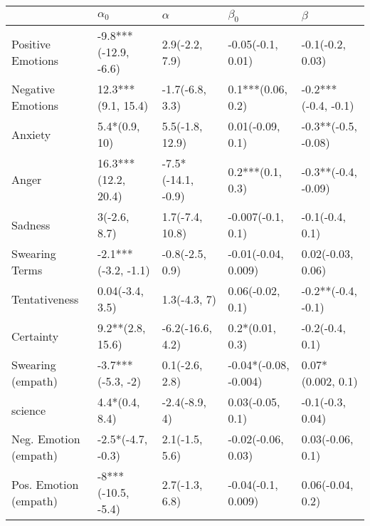 \begin{tabular}{lllll}
\toprule
{} &            $\alpha_0$ &            $\alpha$ &              $\beta_0$ &              $\beta$ \\
\midrule
Positive Emotions     &  -9.8***(-12.9, -6.6) &      2.9(-2.2, 7.9) &      -0.05(-0.1, 0.01) &     -0.1(-0.2, 0.03) \\
Negative Emotions     &    12.3***(9.1, 15.4) &     -1.7(-6.8, 3.3) &      0.1***(0.06, 0.2) &  -0.2***(-0.4, -0.1) \\
Anxiety               &         5.4*(0.9, 10) &     5.5(-1.8, 12.9) &       0.01(-0.09, 0.1) &  -0.3**(-0.5, -0.08) \\
Anger                 &   16.3***(12.2, 20.4) &  -7.5*(-14.1, -0.9) &       0.2***(0.1, 0.3) &  -0.3**(-0.4, -0.09) \\
Sadness               &          3(-2.6, 8.7) &     1.7(-7.4, 10.8) &      -0.007(-0.1, 0.1) &      -0.1(-0.4, 0.1) \\
Swearing Terms        &   -2.1***(-3.2, -1.1) &     -0.8(-2.5, 0.9) &    -0.01(-0.04, 0.009) &    0.02(-0.03, 0.06) \\
Tentativeness         &       0.04(-3.4, 3.5) &        1.3(-4.3, 7) &       0.06(-0.02, 0.1) &   -0.2**(-0.4, -0.1) \\
Certainty             &      9.2**(2.8, 15.6) &    -6.2(-16.6, 4.2) &        0.2*(0.01, 0.3) &      -0.2(-0.4, 0.1) \\
Swearing (empath)     &     -3.7***(-5.3, -2) &      0.1(-2.6, 2.8) &  -0.04*(-0.08, -0.004) &    0.07*(0.002, 0.1) \\
science               &        4.4*(0.4, 8.4) &       -2.4(-8.9, 4) &       0.03(-0.05, 0.1) &     -0.1(-0.3, 0.04) \\
Neg. Emotion (empath) &     -2.5*(-4.7, -0.3) &      2.1(-1.5, 5.6) &     -0.02(-0.06, 0.03) &     0.03(-0.06, 0.1) \\
Pos. Emotion (empath) &    -8***(-10.5, -5.4) &      2.7(-1.3, 6.8) &     -0.04(-0.1, 0.009) &     0.06(-0.04, 0.2) \\
\bottomrule
\end{tabular}
